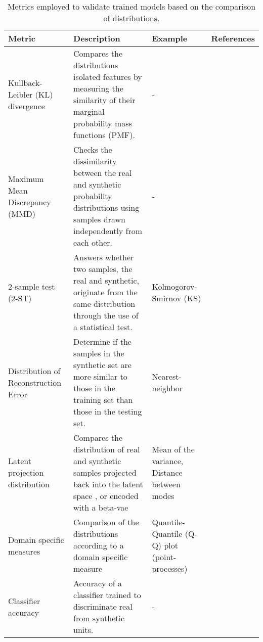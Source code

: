 \begin{table}[htpb]
    \caption{Metrics employed to validate trained models based on the comparison of distributions.\label{tab:evaldist}} 
        
    \begin{tabular}{@{} p{} p{} p{} p{} @{}}\toprule
        
        Metric & Description & Example & References\\\midrule
        
        Kullback-Leibler (KL) divergence & Compares the distributions isolated features by measuring the similarity of their marginal probability mass functions (PMF). & - &
        \cite{Goncalves2020}\\
        
        Maximum Mean Discrepancy (MMD) & 
        Checks the dissimilarity between the real and synthetic probability distributions using samples drawn independently from each other. & - &
        \cite{esteban2017real}\\
        
        2-sample test (2-ST) & Answers whether two samples, the real and synthetic, originate from the same distribution through the use of a statistical test. & 
        Kolmogorov-Smirnov (KS) & 
        \cite{Fisher2019,Baowaly2019}\\
        
        Distribution of Reconstruction Error & 
        Determine if the samples in the synthetic set are more similar to those in the training set than those in the testing set. & Nearest-neighbor &
        \cite{esteban2017real}\\
        
        Latent projection distribution & 
        Compares the distribution of real and synthetic samples projected back into the latent space \cite{Zhang2020-wp}, or encoded with a \gls{beta-vae} \cite{Zhang2020} & Mean of the variance, Distance between modes & \\
        
        Domain specific measures & Comparison of the distributions according to a domain specific measure & Quantile-Quantile (Q-Q) plot (point-processes) & \cite{Xiao2017-lh}\\
        
        Classifier accuracy & Accuracy of a classifier trained to discriminate real from synthetic units. & - & \cite{Fisher2019,walsh2020generating}\\\bottomrule
        
    \end{tabular}
\end{table}